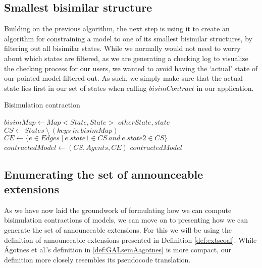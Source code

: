 \subsection{Smallest bisimilar structure}

Building on the previous algorithm, the next step is using it to create an algorithm for constraining a model to one of its smallest bisimilar structures, by filtering out all bisimilar states. While we normally would not need to worry about which states are filtered, as we are generating a checking log to visualize the checking process for our users, we wanted to avoid having the `actual' state of our pointed model filtered out. As such, we simply make sure that the actual state lies first in our set of states when calling $bisimContract$ in our application. 

\begin{algorithm}
	\caption{Bisimulation contraction}
	\label{alg:bisimContract}
	\begin{algorithmic}
			\State $bisimMap \gets Map<State, State>$
						\State {} {$otherState, state$}
					\EndIf
				\EndFor
			\EndFor
			\State $CS \gets States \ \setminus \ (keys \ in \ bisimMap)$
			\State $CE \gets \{ e \in Edges ~|~ e.state1 \in CS \ and \ e.state2 \in CS\}$
			\State $contractedModel \gets (CS, Agents, CE)$
			\State \Return $contractedModel$
		\EndFunction
	\end{algorithmic}
\end{algorithm}

\subsection{Enumerating the set of announceable extensions}

As we have now laid the groundwork of formulating how we can compute bisimulation contractions of models, we can move on to presenting how we can generate the set of announceable extensions. For this we will be using the definition of announceable extensions presented in Definition \ref{def:extscoal}. While Ågotnes et al.'s definition in \ref{def:GALsemAagotnes} is more compact, our definition more closely resembles its pseudocode translation.

